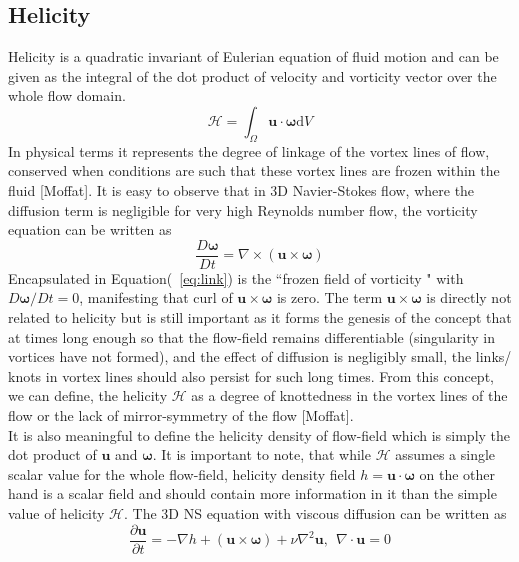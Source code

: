 \subsection{Helicity}
Helicity is a quadratic invariant of Eulerian equation of fluid motion and can be given as the integral of the dot product of velocity and vorticity vector over the whole flow domain.
\begin{equation}
\mathcal{H} = \int_{\Omega}\pmb{u}\cdot\pmb{\omega}\mathrm{d}V \label{eq:hel1}
\end{equation}
In physical terms it represents the degree of linkage of the vortex lines of flow, conserved when conditions are such that these vortex lines are frozen within the fluid [Moffat].
It is easy to observe that in 3D Navier-Stokes flow, where the diffusion term is negligible for very high Reynolds number flow, the vorticity equation can be written as
\begin{equation}
\frac{D \pmb{\omega}}{D t} = \nabla \times (\pmb{u}\times \pmb{\omega}) \label{eq:link}
\end{equation}
Encapsulated in Equation(~\ref{eq:link}) is the ``frozen field of vorticity " with $D\pmb{\omega}/Dt = 0$, manifesting that curl of $\pmb{u}\times \pmb{\omega}$ is zero. The term $\pmb{u}\times \pmb{\omega}$ is directly not related to helicity but is still important as it forms the genesis of the concept that at times long enough so that the flow-field remains differentiable (singularity in vortices have not formed), and the effect of diffusion is negligibly small, the links/ knots in vortex lines should also persist for such long times. From this concept, we can define, the helicity $\mathcal{H}$ as a degree of knottedness in the vortex lines of the flow or the lack of mirror-symmetry of the flow [Moffat]. \\
It is also meaningful to define the helicity density of flow-field which is simply the dot product of $\pmb{u}$ and $\pmb{\omega}$. It is important to note, that while $\mathcal{H}$ assumes a single scalar value for the whole flow-field, helicity density field $h = \pmb{u}\cdot \pmb{\omega}$ on the other hand is a scalar field and should contain more information in it than the simple value of helicity $\mathcal{H}$. The 3D NS equation with viscous diffusion can be written as 
\begin{equation}
\frac{\partial \pmb{u}}{\partial t} = -\nabla h + (\pmb{u}\times \pmb{\omega}) + \nu \nabla ^{2} \pmb{u}, \ \ \nabla \cdot \pmb{u} = 0 \label{eq:nsh}
\end{equation} 
